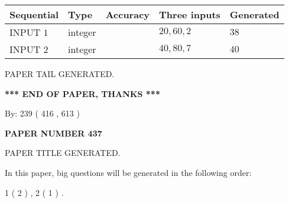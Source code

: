 \documentclass[12pt]{article}
\begin{document}
   
  
  
\noindent\begin{tabular}{|l|l|l|l|l|}
\hline
 Sequential & Type & Accuracy & Three inputs & Generated \\ 
\hline
 
 
  INPUT $  1 $ & integer &  & $
 20
 , 
 60
 , 
 2
 $ & $ 38 $ 
 \\  \hline  
 
 
  INPUT $  2 $ & integer &  & $
 40
 , 
 80
 , 
 7
 $ & $ 40 $ 
 \\  \hline  
 \end{tabular}
   
   
   
   
   
   
 \vspace{0.2in}
 
   
   
\vspace{2.0in} PAPER TAIL GENERATED.
   
   
   
   
\vspace{1.0in} 
{\textbf{\large{ *** END OF PAPER, THANKS *** }}} 
   
   
\hspace{1.0in} By: 
 239 ( 416 ,  613 )
   
   
   
   
\newpage 
\setcounter{page}{ 
   437001 } 
   
   
   
   
 {\textbf{ \Large{ PAPER NUMBER  437  }}}
   
   
\vspace{0.2in}
   
   
   
   
   
   
   
   
 \vspace{0.2in}
 
 
 
 
   
   
 PAPER TITLE GENERATED.
   
   
   
\vspace{0.2in}
   
In this paper, big questions will be generated in the following order: 
   
   
   1 ( 2 )
 ,
   2 ( 1 )
 .
  
\end{document}
